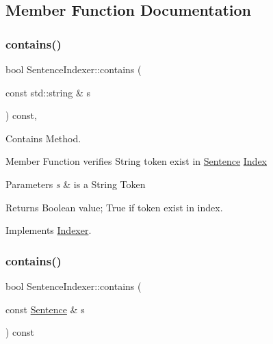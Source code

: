 \subsection{Member Function Documentation}
\mbox{\label{class_sentence_indexer_af3299500d89ff36586472f81eb8efae8}} 
\subsubsection{\texorpdfstring{contains()}{contains()}\hspace{0.1cm}{\footnotesize\ttfamily [1/2]}}
{\footnotesize\ttfamily bool Sentence\+Indexer\+::contains (\begin{DoxyParamCaption}\item[{const std\+::string \&}]{s }\end{DoxyParamCaption}) const\hspace{0.3cm}{\ttfamily [override]}, {\ttfamily [virtual]}}



Contains Method. 

Member Function verifies String token exist in \hyperlink{class_sentence}{Sentence} \hyperlink{class_index}{Index}


\begin{DoxyParams}{Parameters}
{\em s} & is a String Token \\
\hline
\end{DoxyParams}
\begin{DoxyReturn}{Returns}
Boolean value; True if token exist in index. 
\end{DoxyReturn}


Implements \hyperlink{class_indexer_abb847ff86be1ec9265fb53a5ac6f7008}{Indexer}.

\mbox{\label{class_sentence_indexer_aa4af4b0d8b859bd6ff4eed4889c8447c}} 
\subsubsection{\texorpdfstring{contains()}{contains()}\hspace{0.1cm}{\footnotesize\ttfamily [2/2]}}
{\footnotesize\ttfamily bool Sentence\+Indexer\+::contains (\begin{DoxyParamCaption}\item[{const \hyperlink{class_sentence}{Sentence} \&}]{s }\end{DoxyParamCaption}) const}



